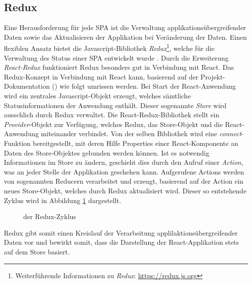 \subsection{Redux}
Eine Herausforderung für jede SPA ist die Verwaltung applikationsübergreifender Daten sowie das Aktualisieren der Applikation bei Veränderung der Daten.
Einen flexiblen Ansatz bietet die Javascript-Bibliothek \emph{Redux}\footnote{Weiterführende Informationen zu \emph{Redux}: \url{https://redux.js.org}}, welche für die Verwaltung des Status einer SPA entwickelt wurde \autocite[vgl.]{Redux:Introduction}. 
Durch die Erweiterung \emph{React-Redux} funktioniert Redux besonders gut in Verbindung mit React.
Das Redux-Konzept in Verbindung mit React kann, basierend auf der Projekt-Dokumentation (\cite{ReactRedux:QuickStart}) wie folgt umrissen werden. Bei Start der React-Anwendung wird ein zentrales Javascript-Objekt erzeugt, welches sämtliche Statusinformationen der Anwendung enthält. Dieser sogenannte \emph{Store} wird ausschlich durch Redux verwaltet. Die React-Redux-Bibliothek stellt ein \emph{Provider}-Objekt zur Verfügung, welches Redux, das Store-Objekt und die React-Anwendung miteinander verbindet. Von der selben Bibliothek wird eine \emph{connect}-Funktion bereitgestellt, mit deren Hilfe Properties einer React-Komponente an Daten des Store-Objektes gebunden werden können. Ist es notwendig Informationen im Store zu ändern, geschieht dies durch den Aufruf einer \emph{Action}, was an jeder Stelle der Applikation geschehen kann. Aufgerufene Actions werden von sogenannten Reducern verarbeitet und erzeugt, basierend auf der Action ein neues Store-Objekt, welches durch Redux aktualisiert wird. Dieser so entstehende Zyklus wird in Abbildung \ref{figure:ReduxCycle} dargestellt.
\begin{figure}[H]
\centering
{}
\caption[Redux-Zyklus]{der Redux-Zyklus}
\label{figure:ReduxCycle}
\end{figure}
Redux gibt somit einen Kreislauf der Verarbeitung applilaktionsübergreifender Daten vor und bewirkt somit, dass die Darstellung der React-Applikation stets auf dem Store basiert.


